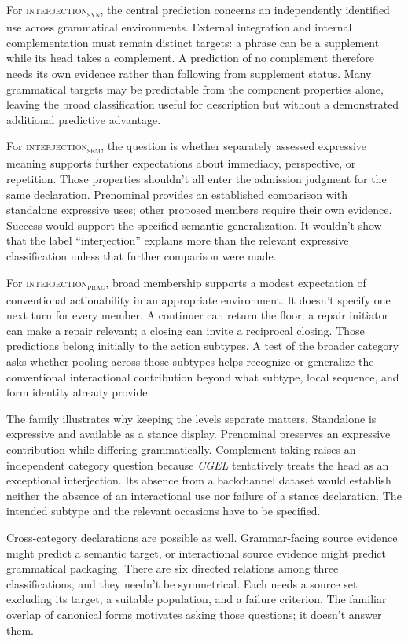 \documentclass[12pt]{article}
\newcommand{\intj}[1]{\textsc{interjection\textsubscript{#1}}}
\begin{document}
For \intj{syn}, the central prediction concerns an independently identified use across grammatical environments. External integration and internal complementation must remain distinct targets: a phrase can be a supplement while its head takes a complement. A prediction of no complement therefore needs its own evidence rather than following from supplement status. Many grammatical targets may be predictable from the component properties alone, leaving the broad classification useful for description but without a demonstrated additional predictive advantage.

For \intj{sem}, the question is whether separately assessed expressive meaning supports further expectations about immediacy, perspective, or repetition. Those properties shouldn't all enter the admission judgment for the same declaration. Prenominal  provides an established comparison with standalone expressive uses; other proposed members require their own evidence. Success would support the specified semantic generalization. It wouldn't show that the label \enquote{interjection} explains more than the relevant expressive classification unless that further comparison were made.

For \intj{prag}, broad membership supports a modest expectation of conventional actionability in an appropriate environment. It doesn't specify one next turn for every member. A continuer can return the floor; a repair initiator can make a repair relevant; a closing can invite a reciprocal closing. Those predictions belong initially to the action subtypes. A test of the broader category asks whether pooling across those subtypes helps recognize or generalize the conventional interactional contribution beyond what subtype, local sequence, and form identity already provide.

The  family illustrates why keeping the levels separate matters. Standalone  is expressive and available as a stance display. Prenominal  preserves an expressive contribution while differing grammatically. Complement-taking  raises an independent category question because \textit{CGEL} tentatively treats the head as an exceptional interjection. Its absence from a backchannel dataset would establish neither the absence of an interactional use nor failure of a stance declaration. The intended subtype and the relevant occasions have to be specified.

Cross-category declarations are possible as well. Grammar-facing source evidence might predict a semantic target, or interactional source evidence might predict grammatical packaging. There are six directed relations among three classifications, and they needn't be symmetrical. Each needs a source set excluding its target, a suitable population, and a failure criterion. The familiar overlap of canonical forms motivates asking those questions; it doesn't answer them.
\end{document}
